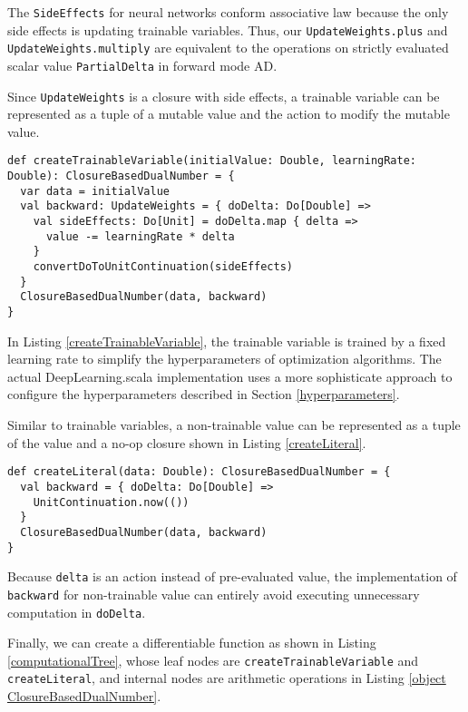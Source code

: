 The \lstinline{SideEffects} for neural networks conform associative law because the only side effects is updating \glspl{trainable variable}. Thus, our \lstinline{UpdateWeights.plus} and \lstinline{UpdateWeights.multiply} are equivalent to the operations on strictly evaluated scalar value \lstinline{PartialDelta} in forward mode AD.

Since \lstinline{UpdateWeights} is a closure with side effects, a \gls{trainable variable} can be represented as a tuple of a mutable value and the action to modify the mutable value.

\begin{lstlisting}[float={htbp},caption={Create a dual number for a \gls{trainable variable}}, label={createTrainableVariable}]
def createTrainableVariable(initialValue: Double, learningRate: Double): ClosureBasedDualNumber = {
  var data = initialValue
  val backward: UpdateWeights = { doDelta: Do[Double] =>
    val sideEffects: Do[Unit] = doDelta.map { delta =>
      value -= learningRate * delta
    }
    convertDoToUnitContinuation(sideEffects)
  }
  ClosureBasedDualNumber(data, backward)
}
\end{lstlisting}

In Listing \ref{createTrainableVariable}, the \gls{trainable variable} is trained by a fixed learning rate to simplify the hyperparameters of optimization algorithms. The actual DeepLearning.scala implementation uses a more sophisticate approach to configure the hyperparameters described in Section \ref{hyperparameters}.

Similar to \glspl{trainable variable}, a non-trainable value can be represented as a tuple of the value and a no-op closure shown in Listing \ref{createLiteral}.

\begin{lstlisting}[float={htbp},caption={Create a dual number for a  non-trainable value}, label={createLiteral}]
def createLiteral(data: Double): ClosureBasedDualNumber = {
  val backward = { doDelta: Do[Double] =>
    UnitContinuation.now(())
  }
  ClosureBasedDualNumber(data, backward)
}
\end{lstlisting}

Because \lstinline{delta} is an action instead of pre-evaluated value, the implementation of \lstinline{backward} for non-trainable value can entirely avoid executing unnecessary computation in \lstinline{doDelta}.

Finally, we can create a differentiable function as shown in Listing \ref{computationalTree}, whose leaf nodes are \lstinline{createTrainableVariable} and \lstinline{createLiteral}, and internal nodes are arithmetic operations in Listing \ref{object ClosureBasedDualNumber}.

